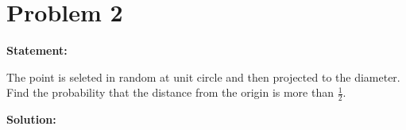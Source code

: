 \section*{Problem 2}

\textbf{Statement:}

The point is seleted in random at unit circle and then projected to the diameter.
Find the probability that the distance from the origin is more than $\frac{1}{2}.$

\noindent\textbf{Solution:}